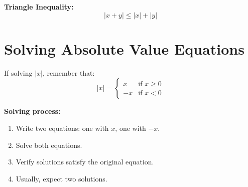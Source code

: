 \documentclass[12pt]{article}
\begin{document}
\textbf{Triangle Inequality:}
\[
\left| x + y \right| \leq \left| x \right| + \left| y \right|
\]

\section*{Solving Absolute Value Equations}

If solving $\left| x \right|$, remember that:
\[
\left| x \right| = 
\begin{cases}
x & \text{if } x \geq 0 \\
-x & \text{if } x < 0
\end{cases}
\]

\textbf{Solving process:}
\begin{enumerate}[label=\arabic*.]
    \item Write two equations: one with $x$, one with $-x$.
    \item Solve both equations.
    \item Verify solutions satisfy the original equation.
    \item Usually, expect two solutions.
\end{enumerate}

\printbibliography
\end{document}
